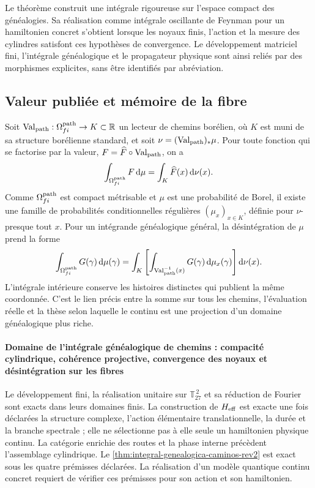 Le théorème construit une intégrale rigoureuse sur l’espace compact des
généalogies. Sa réalisation comme intégrale oscillante de Feynman pour un
hamiltonien concret s’obtient lorsque les noyaux finis, l’action et la
mesure des cylindres satisfont ces hypothèses de convergence. Le développement
matriciel fini, l’intégrale généalogique et le propagateur physique sont ainsi
reliés par des morphismes explicites, sans être identifiés par abréviation.

\subsection{Valeur publiée et mémoire de la fibre}

Soit
\(\operatorname{Val}_{\rm path}:\Omega^{\rm path}_{fi}\to K\subset\mathbb R\)
un lecteur de chemins borélien, où \(K\) est muni de sa structure
borélienne standard, et soit
\(\nu=(\operatorname{Val}_{\rm path})_*\mu\). Pour toute fonction qui
se factorise par la valeur, \(F=\widehat F\circ\operatorname{Val}_{\rm path}\),
on a
\[
 \int_{\Omega^{\rm path}_{fi}}F\,\mathrm d\mu
 =\int_K\widehat F(x)\,\mathrm d\nu(x).
\]
Comme \(\Omega^{\rm path}_{fi}\) est compact métrisable et \(\mu\) est une
probabilité de Borel, il existe une famille de probabilités conditionnelles
régulières \((\mu_x)_{x\in K}\), définie pour \(\nu\)-presque tout \(x\). Pour
un intégrande généalogique général, la désintégration de \(\mu\) prend la forme
\begin{equation}
 \int_{\Omega^{\rm path}_{fi}}G(\gamma)\,\mathrm d\mu(\gamma)
 =\int_K\left[
   \int_{\operatorname{Val}_{\rm path}^{-1}(x)}
   G(\gamma)\,\mathrm d\mu_x(\gamma)
  \right]\mathrm d\nu(x).
 \label{eq:desintegracion-genealogica-caminos-rev2}
\end{equation}
L’intégrale intérieure conserve les histoires distinctes qui publient la même coordonnée. C’est le lien précis entre la somme sur tous les chemins, l’évaluation réelle et la thèse selon laquelle le continu est une projection d’un domaine généalogique plus riche.

\paragraph{Domaine de l’intégrale généalogique de chemins : compacité cylindrique, cohérence projective, convergence des noyaux et désintégration sur les fibres}
Le développement fini, la réalisation unitaire sur
\(\mathbb T_{27}^{\,2}\) et sa réduction de Fourier sont exacts dans leurs domaines
finis. La construction de \(H_{\rm eff}\) est
exacte une fois déclarées la structure complexe, l’action élémentaire
translationnelle, la durée et la branche spectrale ; elle ne sélectionne pas à elle seule un
hamiltonien physique continu. La catégorie enrichie des routes et la phase
interne précèdent l’assemblage cylindrique. Le
\cref{thm:integral-genealogica-caminos-rev2} est exact sous les quatre
prémisses déclarées. La réalisation d’un modèle quantique continu concret
requiert de vérifier ces prémisses pour son action et son hamiltonien.
